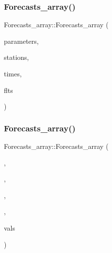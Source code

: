 \subsubsection{\texorpdfstring{Forecasts\+\_\+array()}{Forecasts\_array()}\hspace{0.1cm}{\footnotesize\ttfamily [3/4]}}
{\footnotesize\ttfamily Forecasts\+\_\+array\+::\+Forecasts\+\_\+array (\begin{DoxyParamCaption}\item[{\mbox{\hyperlink{classanen_par_1_1_parameters}{anen\+Par\+::\+Parameters}}}]{parameters,  }\item[{\mbox{\hyperlink{classanen_sta_1_1_stations}{anen\+Sta\+::\+Stations}}}]{stations,  }\item[{\mbox{\hyperlink{classanen_time_1_1_times}{anen\+Time\+::\+Times}}}]{times,  }\item[{\mbox{\hyperlink{classanen_time_1_1_f_l_ts}{anen\+Time\+::\+F\+L\+Ts}}}]{flts }\end{DoxyParamCaption})}

\mbox{\label{class_forecasts__array_ac50579e66269d92ebdbc4dc1ea07f7c8}} 
\subsubsection{\texorpdfstring{Forecasts\+\_\+array()}{Forecasts\_array()}\hspace{0.1cm}{\footnotesize\ttfamily [4/4]}}
{\footnotesize\ttfamily Forecasts\+\_\+array\+::\+Forecasts\+\_\+array (\begin{DoxyParamCaption}\item[{\mbox{\hyperlink{classanen_par_1_1_parameters}{anen\+Par\+::\+Parameters}}}]{,  }\item[{\mbox{\hyperlink{classanen_sta_1_1_stations}{anen\+Sta\+::\+Stations}}}]{,  }\item[{\mbox{\hyperlink{classanen_time_1_1_times}{anen\+Time\+::\+Times}}}]{,  }\item[{\mbox{\hyperlink{classanen_time_1_1_f_l_ts}{anen\+Time\+::\+F\+L\+Ts}}}]{,  }\item[{const std\+::vector$<$ double $>$ \&}]{vals }\end{DoxyParamCaption})}

\mbox{\label{class_forecasts__array_a7e13cb82b1ab76a45946cff992c7fff4}} 
